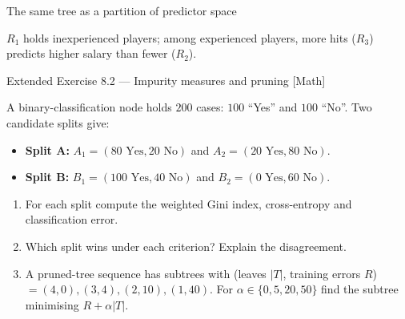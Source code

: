 \documentclass[aspectratio=169,11pt]{beamer}
\begin{document}
\begin{frame}{The same tree as a partition of predictor space}
  \begin{center}
  \end{center}
  \begin{takeaway}$R_1$ holds inexperienced players; among experienced players, more hits ($R_3$) predicts higher salary than fewer ($R_2$).\end{takeaway}
\end{frame}

\begin{frame}{Extended Exercise 8.2 --- Impurity measures and pruning [Math]}
\begin{longexercise}
A binary-classification node holds $200$ cases: $100$ ``Yes'' and $100$ ``No''. Two candidate splits give:
\begin{itemize}
  \item \textbf{Split A:} $A_1=(80\text{ Yes},20\text{ No})$ and $A_2=(20\text{ Yes},80\text{ No})$.
  \item \textbf{Split B:} $B_1=(100\text{ Yes},40\text{ No})$ and $B_2=(0\text{ Yes},60\text{ No})$.
\end{itemize}
\begin{enumerate}
  \item For each split compute the weighted Gini index, cross-entropy and classification error.
  \item Which split wins under each criterion? Explain the disagreement.
  \item A pruned-tree sequence has subtrees with (leaves $|T|$, training errors $R$) $=(4,0),(3,4),(2,10),(1,40)$. For $\alpha\in\{0,5,20,50\}$ find the subtree minimising $R+\alpha|T|$.
\end{enumerate}
\end{longexercise}
\end{frame}
\end{document}
